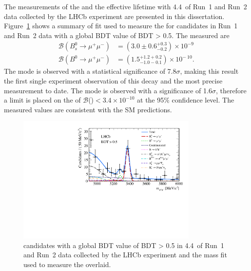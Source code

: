 The measurements of the \bmumu \BFs and the \bsmumu effective lifetime with 4.4~\fb of Run~1 and Run~2 data collected by the LHCb experiment are presented in this dissertation. Figure~\ref{fig:BDT} shows a summary of fit used to measure the \bmumu \BFs for candidates in Run~1 and Run~2 data with a global BDT value of BDT > 0.5. The measured \BFs are
\begin{equation}
\begin{split}
  \mathcal{B}(B^{0}_{s} \to \mu^{+} \mu^{-}) &= (3.0 \pm 0.6^{+0.3}_{-0.2}) \times 10^{-9\
} \\
  \mathcal{B}(B^{0} \to \mu^{+} \mu^{-}) &= (1.5^{+1.2 +0.2}_{-1.0 -0.1})    \times 10^{-\
10}.
\end{split}
\label{eq:BFresults2}
\end{equation}
The \bs mode is observed with a statistical significance of 7.8$\sigma$, making this result the first single experiment observation of this decay and the most precise measurement to date. The \bd mode is observed with a significance of 1.6$\sigma$, therefore a limit is placed on the \BF of $\mathcal{B}$(\bdmumu)$ < 3.4 \times 10^{-10}$ at the 95$\%$ confidence level. The measured values are consistent with the SM predictions. %
\begin{figure}[tbp]
    \centering
        \includegraphics[width=0.8\textwidth]{./Figs/Summary/BDT_plot.pdf}
    \caption{\bmumu candidates with a global BDT value of BDT > 0.5 in 4.4~\fb of Run~1 and Run~2 data collected by the LHCb experiment and the mass fit used to measure the \bmumu \BFs overlaid.}
    \label{fig:BDT}
\end{figure}

